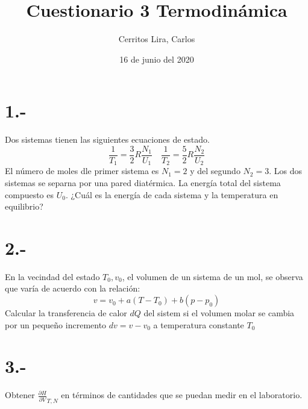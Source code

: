 \documentclass{article}
\title{Cuestionario 3 Termodinámica}
\author{Cerritos Lira, Carlos}
\date{16 de junio del 2020}
\begin{document}
\maketitle
\section*{1.-}
Dos sistemas tienen las siguientes ecuaciones de estado. 
\[ \frac{1}{T_1} = \frac{3}{2}R\frac{N_1}{U_1} \quad 
\frac{1}{T_2} = \frac{5}{2}R\frac{N_2}{U_2} \]
El número de moles dle primer sistema es $N_1 = 2$ y del segundo $N_2 = 3$. Los dos 
sistemas se separna por una pared diatérmica. La energía total del sistema compuesto es $U_0$. 
¿Cuál es la energía de cada sistema y la temperatura en equilibrio?
\begin{tcolorbox}[breakable]
    
\end{tcolorbox}

\section*{2.-}
En la vecindad del estado $T_0,v_0$, el volumen de un sistema de un mol, se observa que varía 
de acuerdo con la relación:
\[ v = v_0 + a(T-T_0) + b(p-p_0) \]
Calcular la transferencia de calor $dQ$ del sistem si el volumen molar se cambia por un pequeño
incremento $dv = v-v_0$ a temperatura constante $T_0$
\begin{tcolorbox}[breakable]
    
\end{tcolorbox}

\section*{3.-}
Obtener $\frac{\partial H}{\partial V}_{T,N}$ en términos de cantidades que se puedan medir en el 
laboratorio.
\begin{tcolorbox}[breakable]
    
\end{tcolorbox}
\end{document}
